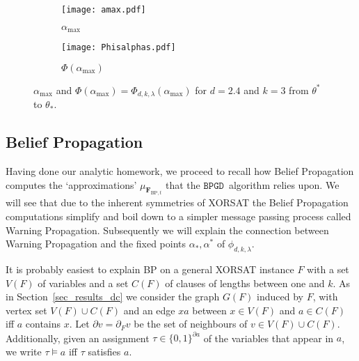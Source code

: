 \documentclass[10pt,reqno]{amsart}
\numberwithin{equation}{section}
\renewcommand{\vec}[1]{\boldsymbol{#1}}
\newcommand{\FBP}[1]{\PHI_{\mathrm{BP},{#1}}}
\newcommand{\amax}{\alpha_{\max}}
\newcommand{\BPGD}{\ensuremath{\mathtt{BPGD}}}
\newcommand\PHI{\vec F}
\newcommand\Sec{Section}
\newcommand{\ph}{\phi_{d,k,\lambda}}
\begin{document}
\begin{figure}
\begin{subfigure}[b]{0.45\textwidth}
		\texttt{[image: amax.pdf]}
		\caption{$\amax$ }
	\end{subfigure}
\begin{subfigure}[b]{0.45\textwidth}		
		\texttt{[image: Phisalphas.pdf]}
\caption{$\Phi(\amax)$}
	\end{subfigure}
	\caption{$\amax$ and $\Phi(\amax) = \Phi_{d,k,\lambda}(\amax)$ for $d=2.4$ and $k=3$ from $\theta^*$ to $\theta_*$.}
	\label{fig_amax}
\end{figure}

\subsection{Belief Propagation}\label{sec_bp}
Having done our analytic homework, we proceed to
recall how Belief Propagation computes the `approximations' $\mu_{\FBP{t}}$ that the \BPGD\ algorithm relies upon.
We will see that due to the inherent symmetries of XORSAT the Belief Propagation computations simplify and boil down to a simpler message passing process called Warning Propagation.
Subsequently we will explain the connection between Warning Propagation and the fixed points $\alpha_*,\alpha^*$ of $\ph$.

It is probably easiest to explain BP on a general XORSAT instance $F$ with a set $V(F)$ of variables and a set $C(F)$ of clauses of lengths between one and $k$.
As in \Sec~\ref{sec_results_dc} we consider the graph $G(F)$ induced by $F$, with vertex set $V(F)\cup  C(F)$ and an edge $xa$ between $x\in V(F)$ and $a\in C(F)$ iff $a$ contains $x$.
Let $\partial v=\partial_Fv$ be the set of neighbours of $v\in V(F)\cup C(F)$.
Additionally, given an assignment $\tau\in\{0,1\}^{\partial a}$ of the variables that appear in $a$, we write $\tau\models a$ iff $\tau$ satisfies $a$.
\end{document}
